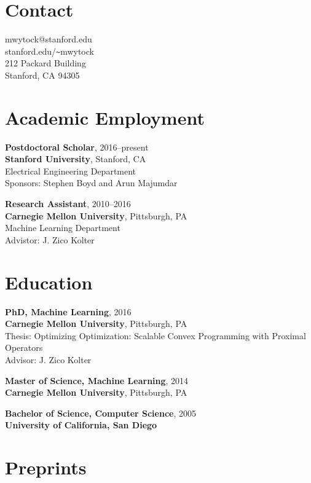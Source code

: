 \documentclass[margin, line]{res}
\begin{document}
\renewcommand{\namefont}{\Huge\bf}


\begin{resume}
\section{Contact}
mwytock@stanford.edu \\
stanford.edu/\verb+~+mwytock \\
212 Packard Building \\
Stanford, CA 94305

\section{Academic Employment}

{\bf Postdoctoral Scholar}, 2016--present \\
{\bf Stanford University}, Stanford, CA \\
Electrical Engineering Department \\
Sponsors: Stephen Boyd and Arun Majumdar

{\bf Research Assistant}, 2010--2016 \\
{\bf Carnegie Mellon University}, Pittsburgh, PA \\
Machine Learning Department \\
Advistor: J. Zico Kolter

\section{Education}

{\bf PhD, Machine Learning}, 2016 \\
{\bf Carnegie Mellon University}, Pittsburgh, PA \\
Thesis: Optimizing Optimization: Scalable Convex Programming with Proximal Operators \\
Advisor: J. Zico Kolter

{\bf Master of Science, Machine Learning}, 2014 \\
{\bf Carnegie Mellon University}, Pittsburgh, PA

{\bf Bachelor of Science, Computer Science}, 2005 \\
{\bf University of California, San Diego}

\section{Preprints}


\end{resume}
\end{document}
